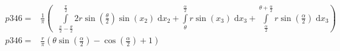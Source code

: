 \begin{align}
    p346 =&\frac{1}{\pi} \left(\;\;\int\limits_{\frac{\pi}{2} - \frac{\theta}{2}}^{\frac{\pi}{2}}2 r \sin{\left (\frac{\theta}{2} \right )} \sin{\left (x_{2} \right )}\;\mathrm{d}x_{2}+\int\limits_{\theta}^{\frac{\alpha}{2}}r \sin{\left (x_{3} \right )}\;\mathrm{d}x_{3}+\int\limits_{\frac{\alpha}{2}}^{\theta + \frac{\alpha}{2}}r \sin{\left (\frac{\alpha}{2} \right )}\;\mathrm{d}x_{3}\right)\label{p346Def}\\
    p346 =& \frac{r}{\pi} \left(\theta \sin{\left (\frac{\alpha}{2} \right )} - \cos{\left (\frac{\alpha}{2} \right )} + 1\right)\label{p346Sln}
\end{align}